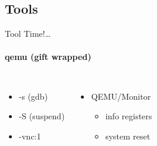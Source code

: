 \subsection{Tools}

\begin{frame}{Tool Time!\ldots}
    \framesubtitle{qemu (gift wrapped)}
    \begin{columns}
             {
              	\begin{itemize}
             		\item -s (gdb)
                	\item -S (suspend)
        	       	\item -vnc:1
	            \end{itemize}
            }
             {
             	\begin{itemize}
            		\item QEMU/Monitor
              		\begin{itemize}
	    	        	\item info registers
    	    	       	\item system reset
    	    	    \end{itemize}
        	    \end{itemize}
        	}
    \end{columns}
\end{frame}

